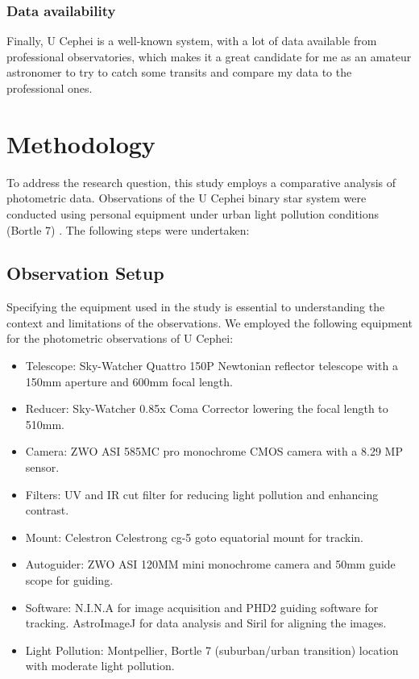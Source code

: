 \documentclass[12pt,a4paper]{article}
\begin{document}
\subsubsection{Data availability}

Finally, U Cephei is a well-known system, with a lot of data available from professional observatories, which makes it a great candidate for me as an amateur astronomer to try to catch some transits and compare my data to the professional ones.

\section{Methodology}
To address the research question, this study employs a comparative analysis of photometric data. Observations of the U Cephei binary star system were conducted using personal equipment under urban light pollution conditions (Bortle 7) \cite{LightPollution}. The following steps were undertaken:

\subsection{Observation Setup}

Specifying the equipment used in the study is essential to understanding the context and limitations of the observations. 
We employed the following equipment for the photometric observations of U Cephei:

\begin{itemize}
    \item Telescope: Sky-Watcher Quattro 150P Newtonian reflector telescope with a 150mm aperture and 600mm focal length.
    \item Reducer: Sky-Watcher 0.85x Coma Corrector lowering the focal length to 510mm.
    \item Camera: ZWO ASI 585MC pro monochrome CMOS camera with a 8.29 MP sensor.
    \item Filters: UV and IR cut filter for reducing light pollution and enhancing contrast.
    \item Mount: Celestron Celestrong cg-5 goto equatorial mount for trackin.
    \item Autoguider: ZWO ASI 120MM mini monochrome camera and 50mm guide scope for guiding.
    \item Software: N.I.N.A for image acquisition and PHD2 guiding software for tracking. AstroImageJ \cite{AstroImageJ} for data analysis and Siril \cite{Siril} for aligning the images.
    \item Light Pollution: Montpellier, Bortle 7 (suburban/urban transition) location with moderate light pollution.
\end{itemize}
\end{document}
